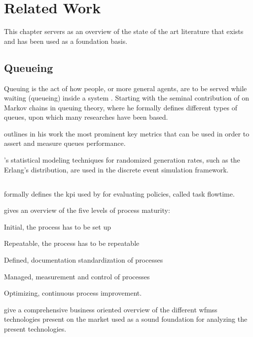 \chapter{Related Work}
\label{ch:related_work}

This chapter servers as an overview of the state of the art literature that exists and has been used as a foundation basis.

\section{Queueing}
\label{sec:queueing}

Queuing is the act of how people, or more general agents, are to be served while waiting (\ie queueing) inside a system \citep{Kendall1953}. Starting with the seminal contribution of \citet{Kendall1953} on Markov chains in queuing theory, where he formally defines different types of queues, upon which many researches have been based.

\citet{Pinedo2008} outlines in his work the most prominent key metrics that can be used in order to assert and measure queues performance.

\citet{Adan2015}'s statistical modeling techniques for randomized generation rates, such as the Erlang's distribution, are used in the discrete event simulation framework.

\section{}
\label{sec:workflow}

\citet{Baker1974} formally defines the \gls{kpi} used by \citet{Zeng2005} for evaluating policies, called task flowtime.

\citet{Macintosh1993} gives an overview of the five levels of process maturity:
\begin{enumerate*}
	\item Initial, the process has to be set up
	\item Repeatable, the process has to be repeatable
	\item Defined, documentation standardization of processes
	\item Managed, measurement and control of processes
	\item Optimizing, continuous process improvement.
\end{enumerate*}

\citet{Georgakopoulos1995} give a comprehensive business oriented overview of the different \glspl{wfms} technologies present on the market used as a sound foundation for analyzing the present technologies.

